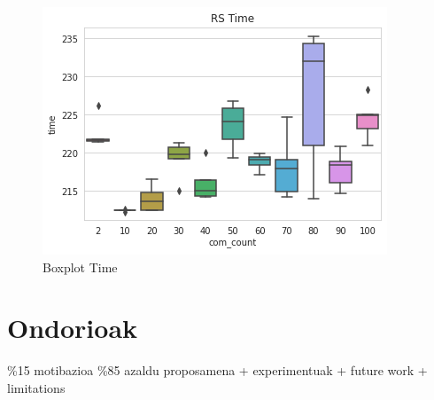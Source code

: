 \documentclass[sigconf]{acmart}
\begin{document}
\begin{figure}
    \centering
    \includegraphics[width=\linewidth]{boxplot_time}
    \caption{Boxplot Time}
    \label{fig:boxplot}
\end{figure}

\section{Ondorioak}
\%15 motibazioa
\%85 azaldu proposamena + experimentuak + future work + limitations



\end{document}

